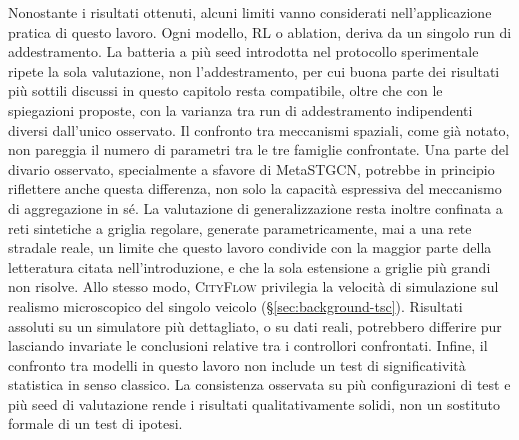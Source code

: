 Nonostante i risultati ottenuti, alcuni limiti vanno considerati
nell'applicazione pratica di questo lavoro. Ogni modello, RL o ablation,
deriva da un singolo run di addestramento. La batteria a più seed
introdotta nel protocollo sperimentale ripete la sola valutazione, non
l'addestramento, per cui buona parte dei risultati più sottili discussi
in questo capitolo resta compatibile, oltre che con le spiegazioni
proposte, con la varianza tra run di addestramento indipendenti diversi
dall'unico osservato. Il confronto tra meccanismi spaziali, come già
notato, non pareggia il numero di parametri tra le tre famiglie
confrontate. Una parte del divario osservato, specialmente a sfavore di
MetaSTGCN, potrebbe in principio riflettere anche questa differenza, non
solo la capacità espressiva del meccanismo di aggregazione in sé. La
valutazione di generalizzazione resta inoltre confinata a reti sintetiche
a griglia regolare, generate parametricamente, mai a una rete stradale
reale, un limite che questo lavoro condivide con la maggior parte della
letteratura citata nell'introduzione, e che la sola estensione a griglie
più grandi non risolve. Allo stesso modo, \textsc{CityFlow} privilegia la
velocità di simulazione sul realismo microscopico del singolo veicolo
(§\ref{sec:background-tsc}). Risultati assoluti su un simulatore più
dettagliato, o su dati reali, potrebbero differire pur lasciando invariate
le conclusioni relative tra i controllori confrontati. Infine, il
confronto tra modelli in questo lavoro non include un test di
significatività statistica in senso classico. La consistenza osservata su
più configurazioni di test e più seed di valutazione rende i risultati
qualitativamente solidi, non un sostituto formale di un test di ipotesi.
